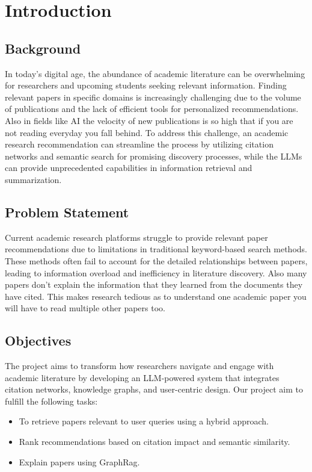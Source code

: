 \documentclass[a4paper,12pt]{article}
\begin{document}
\setcounter{page}{1}

\section{Introduction}
\subsection{Background}
In today's digital age, the abundance of academic literature can be overwhelming
for researchers and upcoming students seeking relevant information. Finding relevant
papers in specific domains is increasingly challenging due to the volume of
publications and the lack of efficient tools for personalized recommendations. Also
in fields like AI the velocity of new publications is so high that if you are not
reading everyday you fall behind. To address this challenge, an academic research
recommendation can streamline the process by utilizing citation networks and
semantic search for promising discovery processes, while the LLMs can provide
unprecedented capabilities in information retrieval and summarization.

\subsection{Problem Statement}
Current academic research platforms struggle to provide relevant paper
recommendations due to limitations in traditional keyword-based search methods.
These methods often fail to account for the detailed relationships between papers,
leading to information overload and inefficiency in literature discovery. Also many
papers don't explain the information that they learned from the documents they
have cited. This makes research tedious as to understand one academic paper you
will have to read multiple other papers too.

\subsection{Objectives}
The project aims to transform how researchers navigate and engage with academic
literature by developing an LLM-powered system that integrates citation networks,
knowledge graphs, and user-centric design. Our project aim to fulfill the following tasks:
\vspace{-25pt}
\begin{itemize}
    \item To retrieve papers relevant to user queries using a hybrid approach.
    \vspace{-10pt}
    \item Rank recommendations based on citation impact and semantic similarity.
    \vspace{-10pt}
    \item Explain papers using GraphRag.
\end{itemize}
\end{document}
